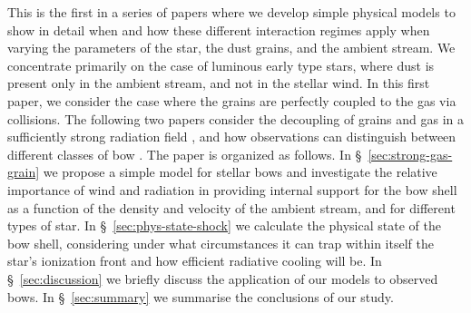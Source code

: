 

This is the first in a series of papers where we develop simple
physical models to show in detail when and how these different
interaction regimes apply when varying the parameters of the star, the
dust grains, and the ambient stream.  We concentrate primarily on the
case of luminous early type stars, where dust is present only in the
ambient stream, and not in the stellar wind.  In this first paper, we
consider the case where the grains are perfectly coupled to the gas
via collisions.  The following two papers consider the decoupling of
grains and gas in a sufficiently strong radiation field
\citep[Paper~II]{Henney:2019b}, and how observations can distinguish
between different classes of bow \citep[Paper~III]{Henney:2019c}.
%
The paper is organized as follows.
%
In \S~\ref{sec:strong-gas-grain} we propose a simple model for stellar
bows and investigate the relative importance of wind and radiation in
providing internal support for the bow shell as a function of the
density and velocity of the ambient stream, and for different types of
star.  In \S~\ref{sec:phys-state-shock} we calculate the physical
state of the bow shell, considering under what circumstances it can
trap within itself the star's ionization front and how efficient
radiative cooling will be.
%
In \S~\ref{sec:discussion} we briefly discuss the application
of our models to observed bows.
%
In \S~\ref{sec:summary} we summarise the conclusions of our study. 
%








